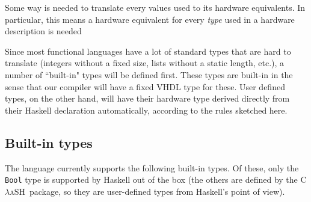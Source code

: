 \documentclass[conference,pdf,a4paper,10pt,final,twoside,twocolumn]{IEEEtran}
\def\CLaSH{\textsc{C$\lambda$aSH}}
\def\hs#1{\texttt{#1}}
\def\quote#1{``{#1}"}
\begin{document}
    Some way is needed to translate every values used to its hardware
    equivalents. In particular, this means a hardware equivalent for
    every \emph{type} used in a hardware description is needed

    Since most functional languages have a lot of standard types that
    are hard to translate (integers without a fixed size, lists without
    a static length, etc.), a number of \quote{built-in} types will be
    defined first. These types are built-in in the sense that our
    compiler will have a fixed VHDL type for these. User defined types,
    on the other hand, will have their hardware type derived directly
    from their Haskell declaration automatically, according to the rules
    sketched here.

  \subsection{Built-in types}
    The language currently supports the following built-in types. Of these,
    only the \hs{Bool} type is supported by Haskell out of the box (the
    others are defined by the \CLaSH\ package, so they are user-defined types
    from Haskell's point of view).
\end{document}
